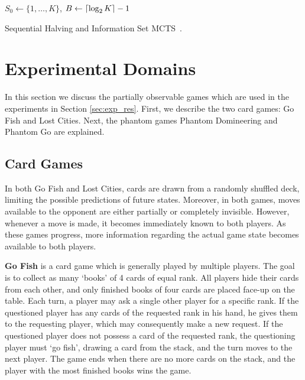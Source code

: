 \documentclass[a4paper]{llncs}
\DeclarePairedDelimiter{\ceil}{\lceil}{\rceil}
\DeclarePairedDelimiter{\floor}{\lfloor}{\rfloor}
\begin{document}
\IncMargin{1em}
\begin{algorithm2e}[ht]
	\vspace{0.05cm}
	$S_0 \gets \{1,\dots,K\}$,
	$B \gets \ceil{\log_2{K}} - 1$														\;
	\BlankLine
  \caption[Sequential Halving]{Sequential Halving and Information Set MCTS~\protect. \label{alg:seqhalv-mcts}}
\end{algorithm2e}
\DecMargin{1em}

\section{Experimental Domains}
\label{sec:exp_dom}

In this section we discuss the partially observable games which are used in the experiments in Section \ref{sec:exp_res}. First, we describe the two card games: Go Fish and Lost Cities. Next, the phantom games Phantom Domineering and Phantom Go are explained.

\subsection{Card Games}

In both Go Fish and Lost Cities, cards are drawn from a randomly shuffled deck, limiting the possible predictions of future states. Moreover, in both games, moves available to the opponent are either partially or completely invisible. However, whenever a move is made, it becomes immediately known to both players. As these games progress, more information regarding the actual game state becomes available to both players.

{\sc \bf Go Fish} is a card game which is generally played by multiple players. The goal is to collect as many `books' of 4 cards of equal rank. All players hide their cards from each other, and only finished books of four cards are placed face-up on the table. Each turn, a player may ask a single other player for a specific rank. If the questioned player has any cards of the requested rank in his hand, he gives them to the requesting player, which may consequently make a new request. If the questioned player does not possess a card of the requested rank, the questioning player must `go fish', drawing a card from the stack, and the turn moves to the next player. The game ends when there are no more cards on the stack, and the player with the most finished books wins the game.
\end{document}
